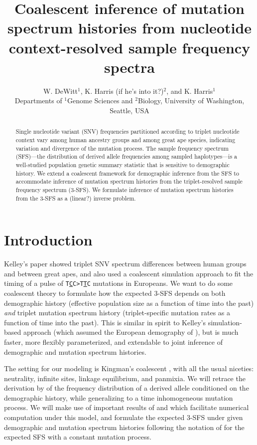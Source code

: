 \documentclass[11pt]{article}
\title{Coalescent inference of mutation spectrum histories from nucleotide context-resolved sample frequency spectra}
\author{
W. DeWitt$^{1}$, K. Harris (if he's into it?)$^{2}$, and K. Harris$^{1}$\\
\small{Departments of $^1$Genome Sciences and $^2$Biology, University of Washington, Seattle, USA}
}
\begin{document}
\maketitle

\begin{abstract}

Single nucleotide variant (SNV) frequencies partitioned according to triplet nucleotide context vary among human ancestry groups and among great ape species, indicating variation and divergence of the mutation process.
The sample frequency spectrum (SFS)---the distribution of derived allele frequencies among sampled haplotypes---is a well-studied population genetic summary statistic that is sensitive to demographic history.
We extend a coalescent framework for demographic inference from the SFS to accommodate inference of mutation spectrum histories from the triplet-resolved sample frequency spectrum (3-SFS).
We formulate inference of mutation spectrum histories from the 3-SFS as a (linear?) inverse problem.

\end{abstract}


\section*{Introduction}\label{sec:intro}

Kelley's paper \cite{Harris2017-fw} showed triplet SNV spectrum differences between human groups and between great apes, and also used a coalescent simulation approach to fit the timing of a pulse of \texttt{T\underline{C}C>T\underline{T}C} mutations in Europeans.
We want to do some coalescent theory to formulate how the expected 3-SFS depends on both demographic history (effective population size as a function of time into the past) \emph{and} triplet mutation spectrum history (triplet-specific mutation rates as a function of time into the past).
This is similar in spirit to Kelley's simulation-based approach (which assumed the European demography of \cite{?}), but is much faster, more flexibly parameterized, and extendable to joint inference of demographic and mutation spectrum histories.

The setting for our modeling is Kingman's coalescent \citep{Kingman1982-ge, Kingman1982-tf, Kingman1982-ys, Kingman2000-jr}, with all the usual niceties: neutrality, infinite sites, linkage equilibrium, and panmixia.
We will retrace the derivation by \cite{Griffiths1998-qf} of the frequency distribution of a derived allele conditioned on the demographic history, while generalizing to a time inhomogeneous mutation process.
We will make use of important results of \cite{Polanski2003-kg} and \cite{Polanski2003-ll} which facilitate numerical computation under this model, and formulate the expected 3-SFS under given demographic and mutation spectrum histories following the notation of \cite{Rosen2018-bb} for the expected SFS with a constant mutation process.
\end{document}
